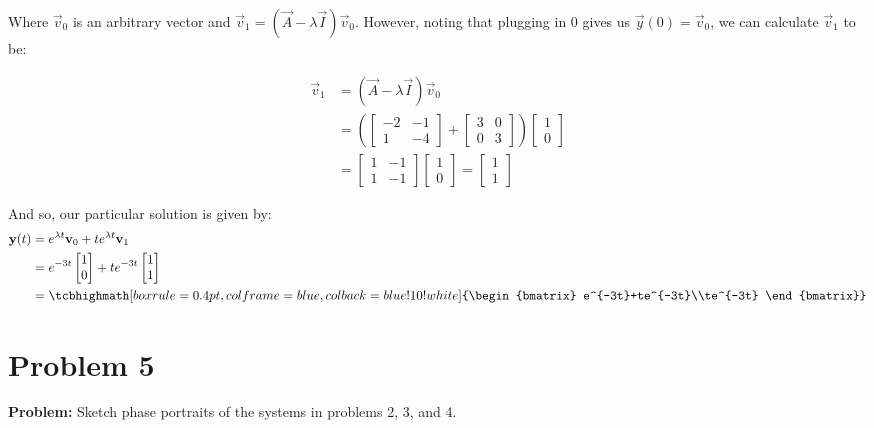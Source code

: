 \documentclass{article}
\begin{document}
Where $\vec v_0$ is an arbitrary vector and $\vec v_1=(\vec A-\lambda\vec I)\vec v_0$. However, noting that plugging in 0 gives us $\vec y(0)=\vec v_0$, we can calculate $\vec v_1$ to be:

\begin{align*}
  \vec v_1&=(\vec A-\lambda\vec I)\vec v_0\\
  &=\left(\begin{bmatrix}
    -2&-1\\1&-4
  \end{bmatrix}+\begin{bmatrix}
    3&0\\0&3
  \end{bmatrix}\right)\begin{bmatrix}
    1\\0
  \end{bmatrix}\\
  &=\begin{bmatrix}
    1&-1\\1&-1
  \end{bmatrix}\begin{bmatrix}
    1\\0
  \end{bmatrix}=\begin{bmatrix}
    1\\1
  \end{bmatrix}
\end{align*}

And so, our particular solution is given by:
\begin{align*}
  \vec y(t)&=e^{\lambda t}\vec v_0+te^{\lambda t}\vec v_1\\
  &=e^{-3t}\begin{bmatrix}
    1\\0
  \end{bmatrix}+te^{-3t}\begin{bmatrix}
    1\\1
  \end{bmatrix}\\
  &=\tcbhighmath[boxrule=0.4pt,colframe=blue,colback=blue!10!white]{\begin{bmatrix}
    e^{-3t}+te^{-3t}\\te^{-3t}
  \end{bmatrix}}
\end{align*}

\section*{Problem 5}
\noindent\textbf{Problem:} Sketch phase portraits of the systems in problems 2, 3, and 4.
\bigskip
\end{document}
